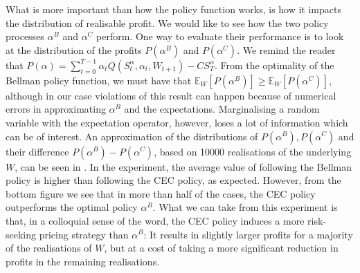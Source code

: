 \documentclass[main.tex]{subfiles}
\begin{document}
What is more important than how the policy function works, is how it
impacts the distribution of realisable profit. We would like to
see how the two policy processes $\alpha^B$ and $\alpha^C$ perform.
One way to evaluate their performance is to look at
the distribution of the profits $P(\alpha^B)$ and $P(\alpha^C)$.
We remind the reader that
$P(\alpha) =
\sum_{t=0}^{T-1}\alpha_tQ(S_t^\alpha,\alpha_t,W_{t+1})-CS_T^\alpha$.
From the optimality of the Bellman policy function, we must have
that $\mathbb{E}_W[P(\alpha^B)]\geq \mathbb{E}_W[P(\alpha^C)]$,
although in our case violations of this result can
happen because of
numerical errors in approximating $\alpha^B$ and the expectations.
Marginalising a random variable with the expectation operator, however,
loses a lot of information which can be of interest.
An approximation of the distributions of $P(\alpha^B), P(\alpha^C)$
and their difference
$P(\alpha^B)-P(\alpha^C)$, based on \num{10000} realisations of the
underlying $W$, can be seen in .
In the experiment, the average value of following the
Bellman policy is higher than following the CEC policy, as expected.
However, from the bottom figure we see that
in more than half of the cases, the CEC policy outperforms the optimal
policy $\alpha^B$. What we can take from this experiment is that, in a
colloquial sense of the word,
the CEC policy induces a more risk-seeking pricing strategy than
$\alpha^B$: It results in slightly larger profits for a majority of the
realisations of $W$, but at a cost of taking a more significant
reduction in
profits in the remaining realisations.
\end{document}
